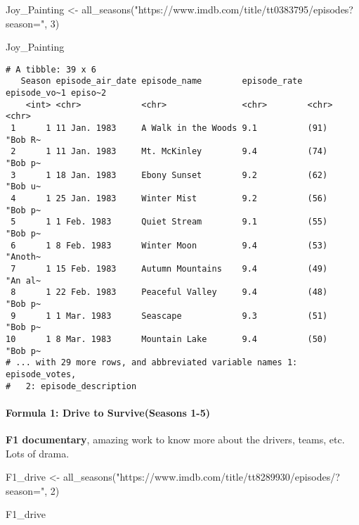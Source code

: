 \documentclass[
  letterpaper,
  DIV=11,
  numbers=noendperiod]{scrartcl}
\let\oldparagraph\paragraph
\renewcommand{\paragraph}[1]{\oldparagraph{#1}\mbox{}}
\newenvironment{Shaded}{\begin{snugshade}}{\end{snugshade}}
\newcommand{\DecValTok}[1]{\textcolor[rgb]{0.68,0.00,0.00}{#1}}
\newcommand{\FunctionTok}[1]{\textcolor[rgb]{0.28,0.35,0.67}{#1}}
\newcommand{\NormalTok}[1]{\textcolor[rgb]{0.00,0.23,0.31}{#1}}
\newcommand{\OtherTok}[1]{\textcolor[rgb]{0.00,0.23,0.31}{#1}}
\newcommand{\StringTok}[1]{\textcolor[rgb]{0.13,0.47,0.30}{#1}}
\begin{document}
\begin{Shaded}
\begin{Highlighting}[]
\NormalTok{Joy\_Painting }\OtherTok{\textless{}{-}} \FunctionTok{all\_seasons}\NormalTok{(}\StringTok{"https://www.imdb.com/title/tt0383795/episodes?season="}\NormalTok{, }\DecValTok{3}\NormalTok{)}

\NormalTok{Joy\_Painting}
\end{Highlighting}
\end{Shaded}

\begin{verbatim}
# A tibble: 39 x 6
   Season episode_air_date episode_name        episode_rate episode_vo~1 episo~2
    <int> <chr>            <chr>               <chr>        <chr>        <chr>  
 1      1 11 Jan. 1983     A Walk in the Woods 9.1          (91)         "Bob R~
 2      1 11 Jan. 1983     Mt. McKinley        9.4          (74)         "Bob p~
 3      1 18 Jan. 1983     Ebony Sunset        9.2          (62)         "Bob u~
 4      1 25 Jan. 1983     Winter Mist         9.2          (56)         "Bob p~
 5      1 1 Feb. 1983      Quiet Stream        9.1          (55)         "Bob p~
 6      1 8 Feb. 1983      Winter Moon         9.4          (53)         "Anoth~
 7      1 15 Feb. 1983     Autumn Mountains    9.4          (49)         "An al~
 8      1 22 Feb. 1983     Peaceful Valley     9.4          (48)         "Bob p~
 9      1 1 Mar. 1983      Seascape            9.3          (51)         "Bob p~
10      1 8 Mar. 1983      Mountain Lake       9.4          (50)         "Bob p~
# ... with 29 more rows, and abbreviated variable names 1: episode_votes,
#   2: episode_description
\end{verbatim}

\hypertarget{formula-1-drive-to-surviveseasons-1-5}{%
\paragraph{Formula 1: Drive to Survive(Seasons
1-5)}\label{formula-1-drive-to-surviveseasons-1-5}}

\textbf{F1 documentary}, amazing work to know more about the drivers,
teams, etc. Lots of drama.

\begin{Shaded}
\begin{Highlighting}[]
\NormalTok{F1\_drive }\OtherTok{\textless{}{-}} \FunctionTok{all\_seasons}\NormalTok{(}\StringTok{"https://www.imdb.com/title/tt8289930/episodes/?season="}\NormalTok{, }\DecValTok{2}\NormalTok{)}

\NormalTok{F1\_drive}
\end{Highlighting}
\end{Shaded}
\end{document}

